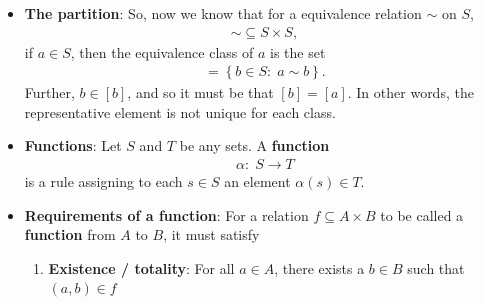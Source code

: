 \documentclass{report}
\begin{document}
\begin{itemize}
            Now, if $ c \in [a]$, then $ a \sim c$. Notice that by transitivity,
            \begin{align*}
                d\sim a,\; a \sim c \implies c \sim d
            .\end{align*}
            Similarly,
            \begin{align*}
                c \sim d,\; d \sim b \implies c \sim b
            .\end{align*}
            Thus, $c \in [b]$. Since $c \in [a]$ implies that $c \in [b]$,
            \begin{align*}
                [a] \subseteq [b]
            .\end{align*}
            A similar argument, except starting with $c \in [b]$ yields that 
            \begin{align*}
                [b] \subseteq [a]
            .\end{align*}
            Hence, if $d \in [a] \cap [b]$, it follows that $[a] = [b]$.
            \bigbreak \noindent 
            Therefore, if $a \in S$, then $a \in [a]$, and if $a \in [b]$, then $[b] = [a]$. Conversely, if $[a] = [b]$, then $a \in [a] = [b]$. $\endpf$
        \item \textbf{The partition}: So, now we know that for a equivalence relation $\sim$ on $S$,
            \begin{align*}
                \sim \subseteq S \times S
            ,\end{align*}
            if $a \in S$, then the equivalence class of $a$ is the set
            \begin{align*}
                [a] = \left\{b \in S:\; a \sim b\right\}
            .\end{align*}
            Further, $b \in [b]$, and so it must be that $[b] = [a]$. In other words, the representative element is not unique for each class.
        \item \textbf{Functions}: Let $S$ and $T$ be any sets. A \textbf{function} 
            \begin{align*}
                \alpha:\; S \to T
            \end{align*}
            is a rule assigning to each $s \in S$ an element $\alpha(s) \in T$.
        \item \textbf{Requirements of a function}: For a relation $f \subseteq A \times B$ to be called a \textbf{function} from $A$ to $B$, it must satisfy
            \begin{enumerate}
                \item \textbf{Existence / totality}: For all $a \in A$, there exists a $b \in B$ such that $(a,b) \in f$

\end{enumerate}
\end{itemize}
\end{document}
